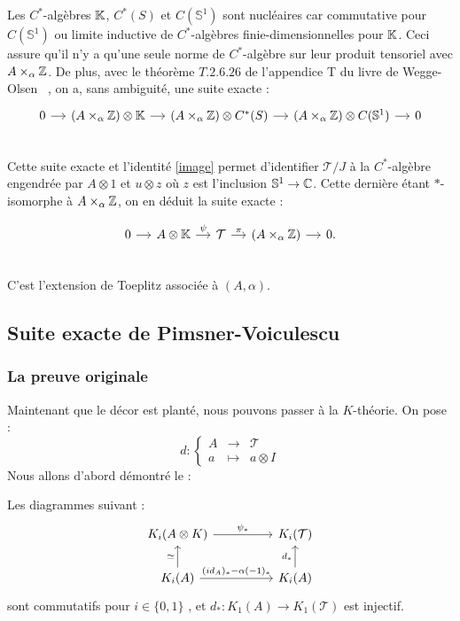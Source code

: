 Les $C^*$-algèbres $\mathbb K$, $C^*(S)$ et $C(\mathbb S^1)$ sont nucléaires car commutative pour $C(\mathbb S^1)$ ou limite inductive de $C^*$-algèbres finie-dimensionnelles pour $\mathbb K$. %
Ceci assure qu'il n'y a qu'une seule norme de  $C^*$-algèbre sur leur produit tensoriel avec $A\times _\alpha \mathbb Z$. De plus, avec le théorème $T.2.6.26$ de l'appendice T du livre de Wegge-Olsen ~\cite{WeggeOlsen}, on a, sans ambiguité, une suite exacte :
\[\begin{tikzcd}[column sep=small]
0 \arrow{r} & (A\times _\alpha \Z)\otimes \K \arrow{r} &  (A\times _\alpha \Z)\otimes C^*(S) \arrow{r}  &  (A\times _\alpha \Z) \otimes C(\mathbb S^1) \arrow{r} & 0 \\ 
\end{tikzcd}\] 
Cette suite exacte et l'identité \ref{image} permet d'identifier $\mathcal T / J$ à la $C^*$-algèbre engendrée par $A\otimes 1$ et $u\otimes z$ où $z$ est l'inclusion $\mathbb S^1 \rightarrow \mathbb C$. Cette dernière étant $*$-isomorphe à $A\times_\alpha \mathbb Z$, on en déduit la suite exacte :

\[\begin{tikzcd}[column sep=small]
0 \arrow{r} &  A\otimes \K \arrow{r}{\psi} &  \mathcal T \arrow{r}{\pi}  &  (A\times _\alpha \Z) \arrow{r} & 0. \\ 
\end{tikzcd}\] 
C'est l'extension de Toeplitz associée à $(A,\alpha)$.
\subsection{Suite exacte de Pimsner-Voiculescu}
\subsubsection{La preuve originale}

Maintenant que le décor est planté, nous pouvons passer à la $K$-théorie. 
On pose :  \[d : \left\{\begin{array}{rcl}A & \rightarrow & \mathcal T \\ a & \mapsto & a\otimes I\end{array}\right.\]
Nous allons d'abord démontré le :

\begin{lem}\label{diagramme}
Les diagrammes suivant :
\[\begin{tikzcd}[column sep = huge]
K_i(A\otimes K) \arrow{r}{\psi_*}& K_i(\mathcal T) \\
K_i(A)   \arrow{u}{\simeq}\arrow{r}{(id_A)_*-\alpha(-1)_*}& K_i(A) \arrow{u}{d_*}
\end{tikzcd}
\]
sont commutatifs pour $i\in\{0,1\}$ , et $d_* : K_1(A)\rightarrow K_1(\mathcal T)$ est injectif.
\end{lem}

